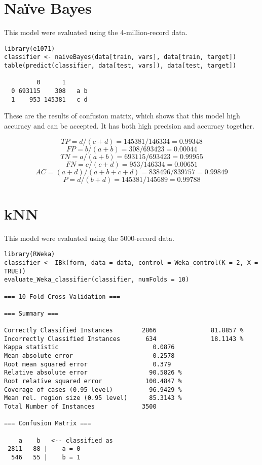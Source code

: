 \documentclass[11pt,a4paper]{article}
\begin{document}
\section{Naïve Bayes}
\label{sec-5}
This model were evaluated using the 4-million-record data.

\begin{verbatim}
library(e1071) 
classifier <- naiveBayes(data[train, vars], data[train, target]) 
table(predict(classifier, data[test, vars]), data[test, target])

         0      1
  0 693115    308   a b
  1    953 145381   c d
\end{verbatim}

These are the results of confusion matrix, which shows that
this model high accuracy and can be accepted. It has
both high precision and accuracy together.

$$TP = d / (c+d) = 145381 / 146334  = 0.99348$$
$$FP = b / (a+b) = 308 / 693423 = 0.00044$$
$$TN = a / (a+b) = 693115 / 693423 = 0.99955$$
$$FN = c / (c+d) = 953 / 146334 = 0.00651$$
$$AC=(a+d)/(a+b+c+d) = 838496 / 839757 = 0.99849$$
$$P = d / (b+d) = 145381 / 145689 = 0.99788 $$

\section{kNN}
\label{sec-6}
This model were evaluated using the 5000-record data.

\begin{verbatim}
library(RWeka)
classifier <- IBk(form, data = data, control = Weka_control(K = 2, X = TRUE))
evaluate_Weka_classifier(classifier, numFolds = 10)

=== 10 Fold Cross Validation ===

=== Summary ===

Correctly Classified Instances        2866               81.8857 %
Incorrectly Classified Instances       634               18.1143 %
Kappa statistic                          0.0876
Mean absolute error                      0.2578
Root mean squared error                  0.379 
Relative absolute error                 90.5826 %
Root relative squared error            100.4847 %
Coverage of cases (0.95 level)          96.9429 %
Mean rel. region size (0.95 level)      85.3143 %
Total Number of Instances             3500     

=== Confusion Matrix ===

    a    b   <-- classified as
 2811   88 |    a = 0
  546   55 |    b = 1
\end{verbatim}
\end{document}
